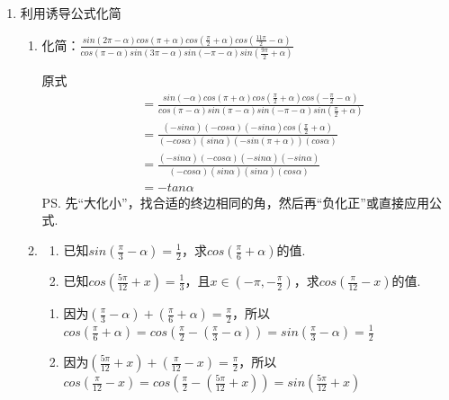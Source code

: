 \begin{enumerate}
\begin{enumerate}
\begin{jieda}
\begin{enumerate}[1.]
        \end{enumerate}
        \end{jieda}
    \end{enumerate}
    \item 利用诱导公式化简
    \begin{enumerate}
        \item 化简：$\frac{sin(2\pi - \alpha) cos(\pi + \alpha)cos(\frac{\pi}{2}+\alpha)cos(\frac{11\pi}{2}-\alpha)}{cos(\pi - \alpha)sin(3\pi-\alpha)sin(-\pi-\alpha)sin(\frac{9\pi}{2}+\alpha)}$
        \begin{jieda}
            原式 \begin{align*}
                & = \frac{sin(-\alpha) cos(\pi + \alpha)cos(\frac{\pi}{2}+\alpha)cos(-\frac{\pi}{2}-\alpha)}{cos(\pi - \alpha)sin(\pi-\alpha)sin(-\pi-\alpha)sin(\frac{\pi}{2}+\alpha)} \\
            & = \frac{(-sin\alpha) (-cos\alpha) (-sin\alpha)cos(\frac{\pi}{2} + \alpha)}{(-cos\alpha)(sin\alpha)(-sin(\pi+\alpha))(cos\alpha)} \\
            & = \frac{(-sin\alpha) (-cos\alpha) (-sin\alpha)(-sin\alpha)}{(-cos\alpha)(sin\alpha)(sin\alpha)(cos\alpha)} \\ & = -tan\alpha
            \end{align*}
            \ps 先“大化小”，找合适的终边相同的角，然后再“负化正”或直接应用公式.
        \end{jieda}
        \item \begin{enumerate}
            \item 已知$sin(\frac{\pi}{3}-\alpha) = \frac{1}{2}$，求$cos(\frac{\pi}{6} + \alpha)$的值.
            \item 已知$cos(\frac{5\pi}{12}+x) = \frac{1}{3}$，且$x \in (-\pi, -\frac{\pi}{2})$，求$cos(\frac{\pi}{12} - x)$的值.
        \end{enumerate}
        \begin{jieda}
            \begin{enumerate}
                \item 因为$(\frac{\pi}{3}-\alpha) + (\frac{\pi}{6} + \alpha) = \frac{\pi}{2}$，所以$cos(\frac{\pi}{6} + \alpha) = cos(\frac{\pi}{2} - (\frac{\pi}{3} - \alpha)) = sin(\frac{\pi}{3} - \alpha) = \frac{1}{2}$
                \item 因为$(\frac{5\pi}{12}+x) + (\frac{\pi}{12} - x) = \frac{\pi}{2}$，所以$cos(\frac{\pi}{12} - x) = cos(\frac{\pi}{2} - (\frac{5\pi}{12}+x)) = sin(\frac{5\pi}{12}+x)$ \\

\end{enumerate}
\end{jieda}
\end{enumerate}
\end{enumerate}
